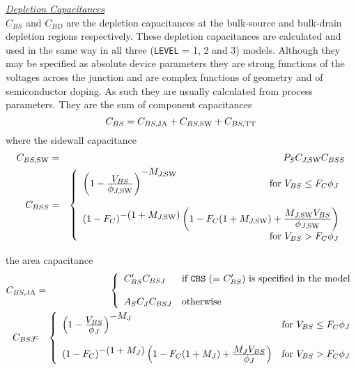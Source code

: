 \noindent\underline{\sl \large Depletion Capacitances}\\[0.1in]
$C_{BS}$ and $C_{BD}$ are the depletion capacitances at the bulk-source
and bulk-drain depletion regions respectively.
These depletion capacitances are
calculated and used in the same way in all three ({\tt LEVEL} = 1, 2 and 3)
models.
Although they may be
specified as absolute device parameters they are strong functions
of the voltages across the junction and
are complex functions of geometry and of semiconductor doping.
As such they are usually calculated from process parameters.
They are the sum of component capacitances
\begin{equation}
C_{BS} = C_{BS,\mbox{\scriptsize JA}} + C_{BS,\mbox{\scriptsize SW}} + C_{BS,\mbox{\scriptsize TT}}
\end{equation}
where the sidewall capacitance
\begin{eqnarray}
C_{BS,\ms{SW}} &=& \PS\CJSW C_{BSS} \\
C_{BSS} &=& \left\{ \begin{array}{l}
       \left( 1 - {{\textstyle V_{BS}}
       \over {\textstyle\PBSW}} \right)^{\textstyle -\MJSW} \hfill
       \mbox{for $V_{BS}  \le \FC\PB$} \\ \\
       (1 - \FC )^{\textstyle -(1+\MJSW )}
       \left(1 - \FC (1+\MJSW )
       + {{\textstyle \MJSW V_{BS}} 
       \over { \textstyle \PBSW}} \right)
       \\ \hspace*{\fill} \mbox{for $V_{BS}  > \FC\PB$}
       \end{array} \right. \\ %
\end{eqnarray}

\noindent
the area capacitance
\begin{eqnarray}
C_{BS,\ms{JA}} &=&
  \left\{ \begin{array}{ll}
  \CBS C_{BSJ} &  \mbox{if {\tt CBS} (= $\CBS$)
                    is specified in the model} \\ \\
  A_S\CJ C_{BSJ} & \mbox{otherwise} \end{array} \right. \\ %
C_{BSJ} &\hspace{-0.1in}=&\hspace{-0.1in} \left\{ \begin{array}{ll}
       \left(1 - {\textstyle {V_{BS}} \over
       {\textstyle \PB}} \right)^{\textstyle -\MJ}
       & \mbox{for $V_{BS}  \le \FC\PB$} \\ \\
       (1 -\FC)^{\textstyle -(1+\MJ)}
       \left(1 - \FC (1+\MJ)
       + {{\textstyle\MJ V_{BS}} 
       \over {\textstyle \PB}} \right)
       & \mbox{for $V_{BS}  > \FC\PB$}
       \end{array} \right. %
\end{eqnarray}

